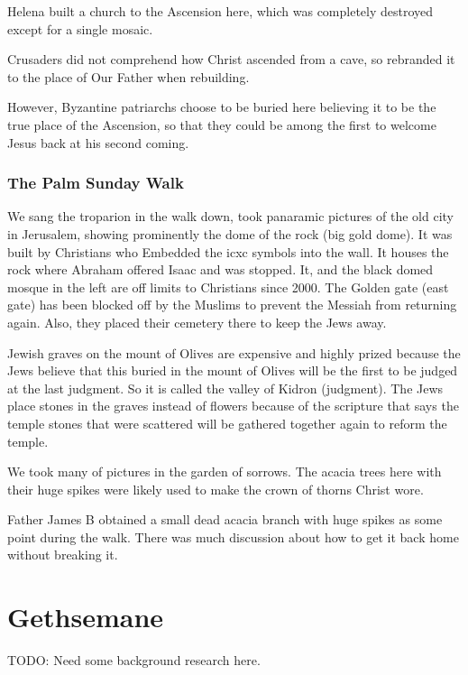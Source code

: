 \documentclass[letterpaper]{report}
\begin{document}
\begin{multicols}{2}
Helena built a church to the Ascension here, which was completely destroyed except for a single mosaic.

Crusaders did not comprehend how Christ ascended from a cave, so rebranded it to the place of Our Father when rebuilding.

However, Byzantine patriarchs choose to be buried here believing it to be the true place of the Ascension, so that they could be among the first to welcome Jesus back at his second coming.

\subsubsection{The Palm Sunday Walk}
We sang the troparion in the walk down, took panaramic pictures of the old city in Jerusalem, showing prominently the dome of the rock (big gold dome).
It was built by Christians who Embedded the icxc symbols into the wall. It houses the rock where Abraham offered Isaac and was stopped. It, and the black domed mosque in the left are off limits to Christians since 2000.
The Golden gate (east gate) has been blocked off by the Muslims to prevent the Messiah from returning again. Also, they placed their cemetery there to keep the Jews away.

Jewish graves on the mount of Olives are expensive and highly prized because the Jews believe that this buried in the mount of Olives will be the first to be judged at the last judgment. So it is called the valley of Kidron (judgment). The Jews place stones in the graves instead of flowers because of the scripture that says the temple stones that were scattered will be gathered together again to reform the temple. 

We took many of pictures in the garden of sorrows.
The acacia trees here with their huge spikes were likely used to make the crown of thorns Christ wore.

Father James B obtained a small dead acacia branch with huge spikes as some point during the walk.
There was much discussion about how to get it back home without breaking it.

\end{multicols}

\clearpage
\section{Gethsemane}
\begin{multicols}{2}
	TODO: Need some background research here.
\end{multicols}
\end{document}
